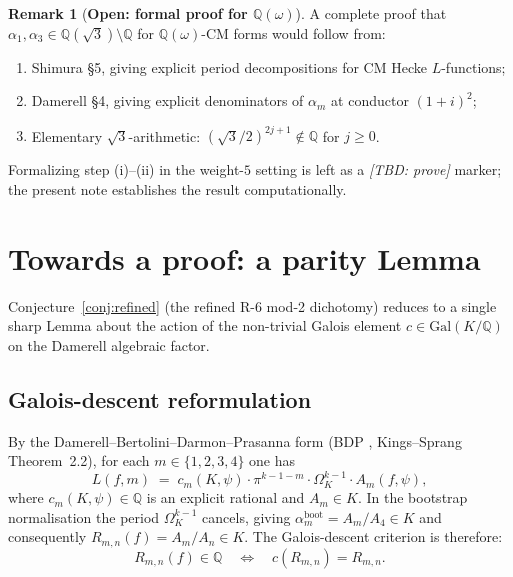 \documentclass[10pt]{article}
\theoremstyle{definition}
\newtheorem{remark}[theorem]{Remark}
\newcommand{\Q}{\mathbb{Q}}
\begin{document}
\begin{remark}[\textbf{Open: formal proof for $\Q(\omega)$}]
\label{rem:TBD}
A complete proof that $\alpha_1, \alpha_3 \in \Q(\sqrt{3})\setminus\Q$ for
$\Q(\omega)$-CM forms would follow from:
\begin{enumerate}
  \item[\rm(i)] Shimura \cite{Shi76} \S{}5, giving explicit period decompositions
        for CM Hecke $L$-functions;
  \item[\rm(ii)] Damerell \cite{Dam71} \S{}4, giving explicit denominators of $\alpha_m$
        at conductor $(1+i)^2$;
  \item[\rm(iii)] Elementary $\sqrt{3}$-arithmetic: $(\sqrt{3}/2)^{2j+1} \notin \Q$ for $j \geq 0$.
\end{enumerate}
Formalizing step (i)--(ii) in the weight-$5$ setting is left as a \emph{[TBD: prove]}
marker; the present note establishes the result computationally.
\end{remark}


\section{Towards a proof: a parity Lemma}
\label{sec:parity-lemma}

Conjecture~\ref{conj:refined} (the refined R-6 mod-2 dichotomy) reduces to a
single sharp Lemma about the action of the non-trivial Galois element
$c \in \mathrm{Gal}(K/\Q)$ on the Damerell algebraic factor.

\subsection{Galois-descent reformulation}

By the Damerell--Bertolini--Darmon--Prasanna form (BDP \cite{BDP13}, Kings--Sprang
\cite{KingsSprang2025} Theorem~2.2), for each $m \in \{1, 2, 3, 4\}$ one has
\begin{equation}
  L(f, m) \;=\; c_m(K, \psi) \cdot \pi^{k-1-m} \cdot \Omega_K^{k-1} \cdot A_m(f, \psi),
\label{eq:damerell-bdp}
\end{equation}
where $c_m(K, \psi) \in \Q$ is an explicit rational and $A_m \in K$.  In the
bootstrap normalisation the period $\Omega_K^{k-1}$ cancels, giving
$\alpha_m^{\mathrm{boot}} = A_m / A_4 \in K$ and consequently
$R_{m,n}(f) = A_m / A_n \in K$.  The Galois-descent criterion is therefore:
\begin{equation}
  R_{m,n}(f) \in \Q \quad\Longleftrightarrow\quad c(R_{m,n}) = R_{m,n}.
\label{eq:galois-criterion}
\end{equation}
\end{document}
